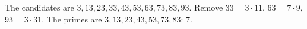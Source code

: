 The candidates are $3,13,23,33,43,53,63,73,83,93$. Remove $33=3\cdot11$, $63=7\cdot9$, $93=3\cdot31$. The primes are $3,13,23,43,53,73,83$: $\boxed{7}$.
